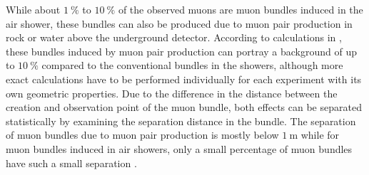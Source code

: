 While about $\SI{1}{\percent}$ to $\SI{10}{\percent}$ of the observed muons are muon bundles induced in the air shower, these bundles can also be produced due to muon pair production in rock or water above the underground detector.
According to calculations in \cite{MupairInRock}, these bundles induced by muon pair production can portray a background of up to $\SI{10}{\percent}$ compared to the conventional bundles in the showers, although more exact calculations have to be performed individually for each experiment with its own geometric properties.
Due to the difference in the distance between the creation and observation point of the muon bundle, both effects can be separated statistically by examining the separation distance in the bundle.
The separation of muon bundles due to muon pair production is mostly below $\SI{1}{\metre}$ while for muon bundles induced in air showers, only a small percentage of muon bundles have such a small separation \cite{MupairInRock}.
